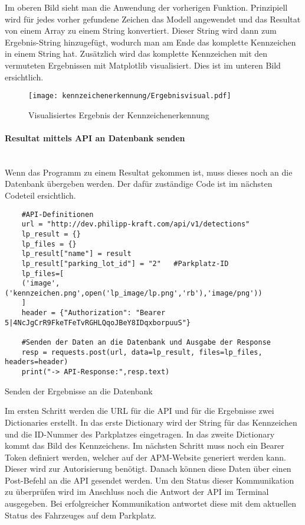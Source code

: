 Im oberen Bild sieht man die Anwendung der vorherigen Funktion. Prinzipiell wird für jedes vorher gefundene Zeichen das Modell angewendet 
und das Resultat von einem Array zu einem String konvertiert. Dieser String wird dann zum Ergebnis-String hinzugefügt, wodurch man am Ende das 
komplette Kennzeichen in einem String hat. Zusätzlich wird das komplette Kennzeichen mit den vermuteten Ergebnissen mit Matplotlib visualisiert. 
Dies ist im unteren Bild ersichtlich.

\begin{figure}[H]
    \centering
    \texttt{[image: kennzeichenerkennung/Ergebnisvisual.pdf]}
    \caption{Visualisiertes Ergebnis der Kennzeichenerkennung}
\end{figure}

\paragraph{Resultat mittels API an Datenbank senden}\mbox{}\\

Wenn das Programm zu einem Resultat gekommen ist, muss dieses noch an die Datenbank übergeben werden. Der dafür zuständige Code ist im nächsten Codeteil ersichtlich.

\begin{longlisting}
    \begin{verbatim}
    #API-Definitionen
    url = "http://dev.philipp-kraft.com/api/v1/detections"
    lp_result = {}
    lp_files = {}
    lp_result["name"] = result 
    lp_result["parking_lot_id"] = "2"   #Parkplatz-ID 
    lp_files=[
    ('image',('kennzeichen.png',open('lp_image/lp.png','rb'),'image/png'))
    ]
    header = {"Authorization": "Bearer 5|4NcJgCrR9FkeTFeTvRGHLQqoJBeY8IDqxborpuuS"}

    #Senden der Daten an die Datenbank und Ausgabe der Response
    resp = requests.post(url, data=lp_result, files=lp_files, headers=header)
    print("-> API-Response:",resp.text)
    \end{verbatim}
    \caption{Senden der Ergebnisse an die Datenbank}
\end{longlisting}

Im ersten Schritt werden die URL für die API und für die Ergebnisse zwei Dictionaries erstellt. In das erste Dictionary wird der String für das Kennzeichen 
und die ID-Nummer des Parkplatzes eingetragen. In das zweite Dictionary kommt das Bild des Kennzeichens. Im nächsten Schritt muss noch ein Bearer Token 
definiert werden, welcher auf der APM-Website generiert werden kann. Dieser wird zur Autorisierung benötigt. Danach können diese Daten über einen Post-Befehl 
an die API gesendet werden. Um den Status dieser Kommunikation zu überprüfen wird im Anschluss noch die Antwort der API im Terminal ausgegeben. Bei 
erfolgreicher Kommunikation antwortet diese mit dem aktuellen Status des Fahrzeuges auf dem Parkplatz.

